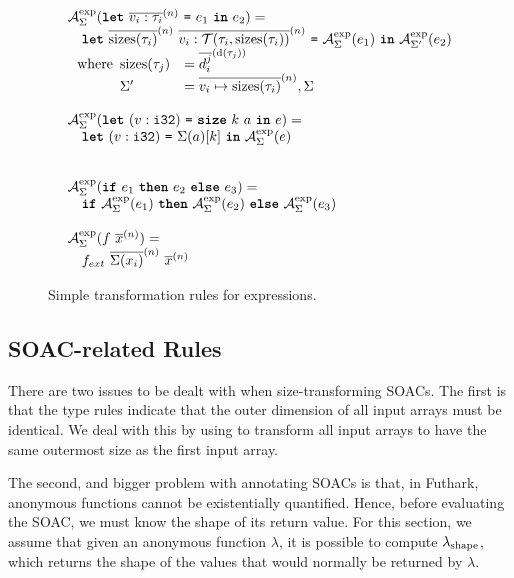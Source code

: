 \begin{figure}

\[
\begin{array}{l}
  \mathcal{A}_{\Sigma}^{\text{exp}}(\mbox{\texttt{\bfseries{let}}}~\overline{v_{i}: \tau_{i}}^{(n)}~\mbox{\texttt{=}}~e_{1}~\mbox{\texttt{\bfseries{in}}}~e_{2}) = \\
  \quad \mbox{\texttt{\bfseries{let}}}~\overline{\textrm{sizes}(\tau_{i})}^{(n)}~\overline{v_{i}: \mathcal{T}(\tau_{i},\textrm{sizes}(\tau_{i}))}^{(n)}~\mbox{\texttt{=}}~\mathcal{A}_{\Sigma}^{\text{exp}}(e_{1})~\mbox{\texttt{\bfseries{in}}}~\mathcal{A}_{\Sigma'}^{\text{exp}}(e_{2}) \\
  ~~ \textrm{where}
  \begin{array}[t]{ll}
    \textrm{sizes}(\tau_j) &= \overline{d^{j}_{i}}^{(\textrm{d}(\tau_{j}))} \\
    \Sigma' &=\overline{v_{i}\mapsto\textrm{sizes}(\tau_{i})}^{(n)},\Sigma
  \end{array}
  \\
  \\
\mathcal{A}_{\Sigma}^{\text{exp}}(\mbox{\texttt{\bfseries{let}}}~(v: \texttt{i32})~\mbox{\texttt{=}}~\mbox{\texttt{\bfseries{size}}}~k~a~\mbox{\texttt{\bfseries{in}}}~e) = \\
\quad \mbox{\texttt{\bfseries{let}}}~(v: \texttt{i32})~\mbox{\texttt{=}}~\Sigma(a)[k]~\mbox{\texttt{\bfseries{in}}}~\mathcal{A}_{\Sigma}^{\text{exp}}(e) \\
\\
\\
\mathcal{A}_{\Sigma}^{\text{exp}}(\mbox{\texttt{\bfseries{if}}}~e_{1}~\mbox{\texttt{\bfseries{then}}}~e_{2}~\mbox{\texttt{\bfseries{else}}}~e_{3}) = \\
\quad \mbox{\texttt{\bfseries{if}}}~\mathcal{A}_{\Sigma}^{\text{exp}}(e_{1})~\mbox{\texttt{\bfseries{then}}}~\mathcal{A}_{\Sigma}^{\text{exp}}(e_{2})~\mbox{\texttt{\bfseries{else}}}~\mathcal{A}_{\Sigma}^{\text{exp}}(e_{3})
  \\
  \\
  \mathcal{A}_{\Sigma}^{\text{exp}}(f~\overline{x}^{(n)}) = \\
  \quad f_{ext}~\overline{\Sigma(x_{i})}^{(n)}~\overline{x}^{(n)}
\end{array}
\]

\caption{Simple transformation rules for expressions.}
\label{fig:simple-transformation-rules}
\end{figure}

\subsection{SOAC-related Rules}
\label{sec:SOACSizeRules}

There are two issues to be dealt with when size-transforming SOACs.
The first is that the type rules indicate that the outer dimension of
all input arrays must be identical.  We deal with this by using
 to transform all input arrays to have the same outermost
size as the first input array.

The second, and bigger problem with annotating SOACs is that, in
Futhark, anonymous functions cannot be existentially quantified.
Hence, before evaluating the SOAC, we must know the shape of its
return value.  For this section, we assume that given an anonymous
function \(\lambda\), it is possible to compute \(\lambda_{\textrm{shape}}\),
which returns the shape of the values that would normally be returned
by \(\lambda\).

